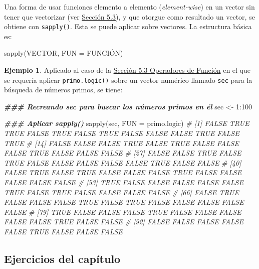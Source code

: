 \documentclass[
]{article}
\newenvironment{Shaded}{\begin{snugshade}}{\end{snugshade}}
\newcommand{\AttributeTok}[1]{\textcolor[rgb]{0.77,0.63,0.00}{#1}}
\newcommand{\CommentTok}[1]{\textcolor[rgb]{0.56,0.35,0.01}{\textit{#1}}}
\newcommand{\DecValTok}[1]{\textcolor[rgb]{0.00,0.00,0.81}{#1}}
\newcommand{\DocumentationTok}[1]{\textcolor[rgb]{0.56,0.35,0.01}{\textbf{\textit{#1}}}}
\newcommand{\FunctionTok}[1]{\textcolor[rgb]{0.00,0.00,0.00}{#1}}
\newcommand{\NormalTok}[1]{#1}
\newcommand{\OtherTok}[1]{\textcolor[rgb]{0.56,0.35,0.01}{#1}}
\newcommand{\SpecialCharTok}[1]{\textcolor[rgb]{0.00,0.00,0.00}{#1}}
\theoremstyle{definition}
\theoremstyle{definition}
\newtheorem{example}{Ejemplo}[section]
\theoremstyle{definition}
\theoremstyle{definition}
\theoremstyle{remark}
\begin{document}
Una forma de usar funciones elemento a elemento (\emph{element-wise}) en un vector sin tener que vectorizar (ver \protect\hyperlink{operadoresfuncion}{Sección 5.3}), y que otorgue como resultado un vector, se obtiene con \texttt{sapply()}. Esta se puede aplicar sobre vectores. La estructura básica es:

\begin{Shaded}
\begin{Highlighting}[]
\FunctionTok{sapply}\NormalTok{(VECTOR, }\AttributeTok{FUN =}\NormalTok{ FUNCIÓN)}
\end{Highlighting}
\end{Shaded}

\begin{example}

Aplicado al caso de la \protect\hyperlink{operadoresfuncion}{Sección 5.3 Operadores de Función} en el que se requería aplicar \texttt{primo.logic()} sobre un vector numérico llamado \texttt{sec} para la búsqueda de números primos, se tiene:

\begin{Shaded}
\begin{Highlighting}[]
\DocumentationTok{\#\#\# Recreando sec para buscar los números primos en él}
\NormalTok{sec }\OtherTok{\textless{}{-}} \DecValTok{1}\SpecialCharTok{:}\DecValTok{100}

\DocumentationTok{\#\#\# Aplicar sapply()}
\FunctionTok{sapply}\NormalTok{(sec, }\AttributeTok{FUN =}\NormalTok{ primo.logic)}
\CommentTok{\#   [1] FALSE  TRUE  TRUE FALSE  TRUE FALSE  TRUE FALSE FALSE FALSE  TRUE FALSE  TRUE}
\CommentTok{\#  [14] FALSE FALSE FALSE  TRUE FALSE  TRUE FALSE FALSE FALSE  TRUE FALSE FALSE FALSE}
\CommentTok{\#  [27] FALSE FALSE  TRUE FALSE  TRUE FALSE FALSE FALSE FALSE FALSE  TRUE FALSE FALSE}
\CommentTok{\#  [40] FALSE  TRUE FALSE  TRUE FALSE FALSE FALSE  TRUE FALSE FALSE FALSE FALSE FALSE}
\CommentTok{\#  [53]  TRUE FALSE FALSE FALSE FALSE FALSE  TRUE FALSE  TRUE FALSE FALSE FALSE FALSE}
\CommentTok{\#  [66] FALSE  TRUE FALSE FALSE FALSE  TRUE FALSE  TRUE FALSE FALSE FALSE FALSE FALSE}
\CommentTok{\#  [79]  TRUE FALSE FALSE FALSE  TRUE FALSE FALSE FALSE FALSE FALSE  TRUE FALSE FALSE}
\CommentTok{\#  [92] FALSE FALSE FALSE FALSE FALSE  TRUE FALSE FALSE FALSE}
\end{Highlighting}
\end{Shaded}

\end{example}

\hypertarget{ejercicios-del-capuxedtulo-2}{%
\subsection{Ejercicios del capítulo}\label{ejercicios-del-capuxedtulo-2}}
\end{document}
